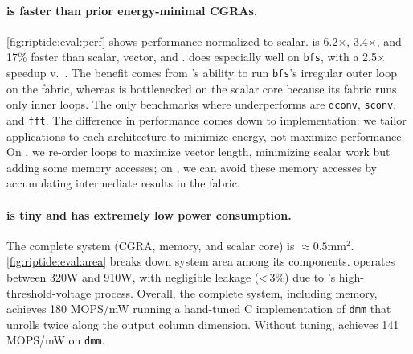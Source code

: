 \paragraph{\riptide is faster than prior energy-minimal CGRAs.}
\autoref{fig:riptide:eval:perf} shows performance normalized to scalar.
%
\riptide is 6.2$\times$, 3.4$\times$, and 17\% faster than scalar, vector, and \snafu.
%
%
%
%
% 
\riptide does especially well on {\tt bfs}, with a 2.5$\times$ speedup v.\ \snafu. The benefit comes
from \riptide's ability to run {\tt bfs}'s irregular outer loop on the fabric, whereas
% 
\snafu is bottlenecked on the scalar core because its fabric runs only inner loops. %
% 
The only benchmarks where \riptide underperforms \snafu are {\tt dconv}, {\tt sconv}, and {\tt fft}.
% 
The difference in performance comes down to implementation: we tailor applications to each architecture to minimize energy, not maximize performance.
% 
On \snafu, we re-order loops to maximize vector length, minimizing scalar work but adding some memory accesses;
on \riptide, we can avoid these memory accesses by accumulating intermediate results in the fabric.

\figRipTideArea
\tabRipTideEvalCompare
\figRipTidePrimaryCompilerResults

\paragraph{\riptide is tiny and has extremely low power consumption.}
\label{riptide:eval:power_area}
The complete \riptide system (CGRA, memory, and scalar core) is $\approx 0.5\text{mm}^2$.
\autoref{fig:riptide:eval:area} breaks down system area among its components.
\riptide operates between 320\textmu W and 910\textmu W,
with negligible leakage (<\,3\%) due to \riptide's high-threshold-voltage process.
% 
Overall, the complete system, including memory, achieves
180 MOPS/mW running a hand-tuned C implementation of {\tt dmm} that unrolls twice along the output column dimension.
% 
Without tuning, \riptide achieves 141 MOPS/mW on {\tt dmm}.

